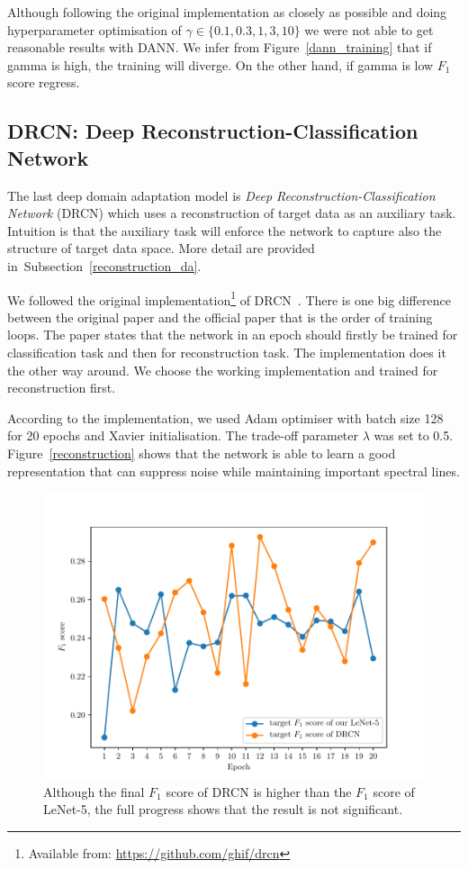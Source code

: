 Although following the original implementation as closely as possible
and doing hyperparameter optimisation of \(\gamma \in \{0.1, 0.3, 1, 3, 10\}\)
we were not able to get reasonable results with DANN.
We infer from Figure~\ref{dann_training} that
if gamma is high, the training will diverge.
On the other hand, if gamma is low \(F_1\) score regress.

\subsection{DRCN: Deep Reconstruction-Classification Network}

The last deep domain adaptation model is \textit{Deep Reconstruction-Classification Network} (DRCN)
which uses a reconstruction of target data as an auxiliary task.
Intuition is that the auxiliary task will enforce the network to capture also the structure of target data space.
More detail are provided in~Subsection~\ref{reconstruction_da}.

We followed the original implementation\footnote{Available from: \url{https://github.com/ghif/drcn}} of DRCN~\cite{ghifary2016}.
There is one big difference between the original paper and the official paper
that is the order of training loops.
The paper states that the network in an epoch
should firstly be trained for classification task
and then for reconstruction task.
The implementation does it the other way around.
We choose the working implementation and trained for reconstruction first.

According to the implementation, we used Adam optimiser with batch size 128 for 20 epochs and Xavier initialisation.
The trade-off parameter \(\lambda\) was set to 0.5.
Figure~\ref{reconstruction} shows that the network is able to learn a good representation that can suppress noise
while maintaining important spectral lines.

\begin{figure}
\begin{center}
\includegraphics[width=.75\textwidth]{img/drcn_f1.pdf}
\end{center}
\caption[Comparison of \(F_1\) score of DRCN and LeNet-5]{
	Although the final \(F_1\) score of DRCN is higher than the \(F_1\) score of LeNet-5,
	the full progress shows that the result is not significant.
}
\label{drcn_f1}
\end{figure}

